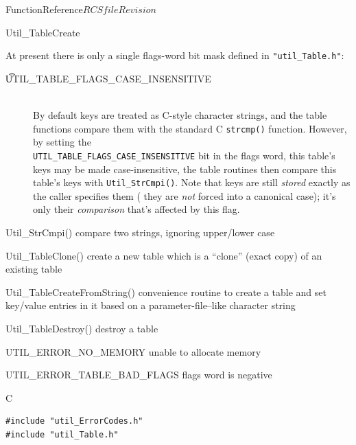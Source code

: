\begin{cactuspart}{FunctionReference}{$RCSfile$}{$Revision$}
\begin{FunctionDescription}{Util\_TableCreate}
\begin{Discussion}
At present there is only a single flags-word bit mask defined
in \verb|"util_Table.h"|:
\begin{description}
\item[{\t UTIL\_TABLE\_FLAGS\_CASE\_INSENSITIVE}]\mbox{}\\
        By default keys are treated as C-style character strings,
        and the table functions compare them with the standard C
        \verb|strcmp()| function.
        However, by setting the\\
        \verb|UTIL_TABLE_FLAGS_CASE_INSENSITIVE|
        bit in the flags word, this table's keys may be made
        case-insensitive, \ie{} the table routines then compare
        this table's keys with \verb|Util_StrCmpi()|.%
        Note that keys are still {\em stored\/} exactly as
        the caller specifies them (\ie{} they are {\em not\/}
        forced into a canonical case); it's only their
        {\em comparison\/} that's affected by this flag.
\end{description}
\end{Discussion}

\begin{SeeAlsoSection}
\begin{SeeAlso}{Util\_StrCmpi()}
compare two strings, ignoring upper/lower case
\end{SeeAlso}
\begin{SeeAlso}{Util\_TableClone()}
create a new table which is a ``clone'' (exact copy) of an existing
table
\end{SeeAlso}
\begin{SeeAlso}{Util\_TableCreateFromString()}
convenience routine to create a table and set key/value entries
in it based on a parameter-file--like character string
\end{SeeAlso}
\begin{SeeAlso}{Util\_TableDestroy()}
destroy a table
\end{SeeAlso}
\end{SeeAlsoSection}

\begin{ErrorSection}
\begin{Error}{UTIL\_ERROR\_NO\_MEMORY}
unable to allocate memory
\end{Error}
\begin{Error}{UTIL\_ERROR\_TABLE\_BAD\_FLAGS}
flags word is negative
\end{Error}
\end{ErrorSection}

\begin{ExampleSection}
\begin{Example}{C}
\begin{verbatim}
#include "util_ErrorCodes.h"
#include "util_Table.h"


\end{verbatim}
\end{Example}
\end{ExampleSection}
\end{FunctionDescription}
\end{cactuspart}

